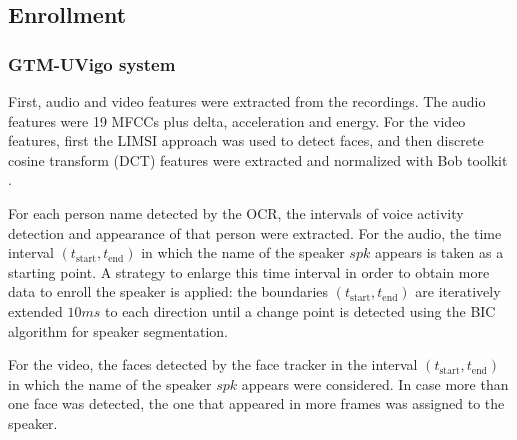 \subsection{Enrollment}

\subsubsection{GTM-UVigo system}
First, audio and video features were extracted from the recordings. The audio features were 19 MFCCs plus delta, acceleration and energy. For the video features, first
the LIMSI approach was used to detect faces, and then discrete cosine transform (DCT) features were extracted and normalized with Bob toolkit \cite{bob2012}.

For each person name detected by the OCR, the intervals of voice activity detection and appearance of that person were extracted. For the audio, 
the time interval $(t_{\mathrm{start}},t_{\mathrm{end}})$ in which the name of the speaker $spk$ appears is taken as a starting point. A strategy to enlarge this time
 interval in order to obtain more data to enroll the speaker is applied: the boundaries $(t_{\mathrm{start}},t_{\mathrm{end}})$ are iteratively extended $10ms$ to each direction until a change point is detected using the BIC algorithm
for speaker segmentation.
%
% 

For the video, the faces detected by the face tracker in the interval $(t_{\mathrm{start}},t_{\mathrm{end}})$ in 
 which the name of the speaker $spk$ appears were considered.
 In case more than one face was detected, the one that appeared in more frames was assigned to the speaker.
 
